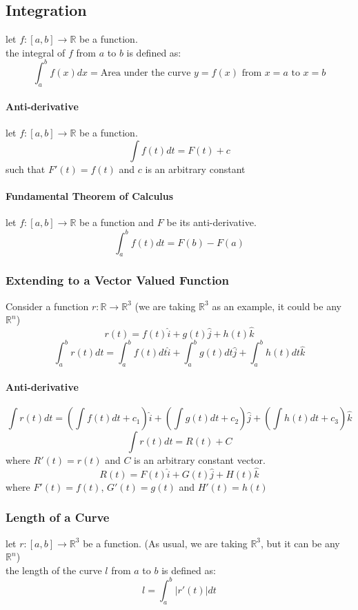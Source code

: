 \documentclass{article}
\begin{document}
\subsection{Integration}
let $f: [a,b] \rightarrow \mathbb{R}$ be a function.\\

the integral of $f$ from $a$ to $b$ is defined as:
\[\int_a^b f(x) dx = \text{Area under the curve $y = f(x)$ from $x = a$ to $x = b$}\]

\paragraph{Anti-derivative}let $f: [a,b] \rightarrow \mathbb{R}$ be a function.\\
\[ \int f(t) dt = F(t) +c \]
such that $F'(t) = f(t)$ and $c$ is an arbitrary constant

\paragraph{Fundamental Theorem of Calculus} let $f: [a,b] \rightarrow \mathbb{R}$ be a function and $F$ be its anti-derivative.\\
\[ \int_{a}^{b} f(t) dt = F(b) - F(a) \]

\subsubsection{Extending to a Vector Valued Function}
Consider a function $r: \mathbb{R} \rightarrow \mathbb{R}^3$ (we are taking $\mathbb{R}^3$ as an example, it could be any $\mathbb{R}^n$)\\
\[ r(t) = f(t)\hat{i} + g(t)\hat{j} + h(t)\hat{k} \]
\[\int_{a}^{b}r(t)dt = \int_{a}^{b}f(t)dt\hat{i} + \int_{a}^{b}g(t)dt\hat{j} + \int_{a}^{b}h(t)dt\hat{k} \]

\paragraph{Anti-derivative}
\[ \int r(t) dt = \left(\int f(t)dt + c_1\right)\hat{i} + \left(\int g(t)dt + c_2\right)\hat{j} + \left(\int h(t)dt + c_3\right)\hat{k}  \]
\[ \int r(t) dt = R(t) + C \]
where $R'(t) = r(t)$ and $C$ is an arbitrary constant vector.
\[ R(t) = F(t)\hat{i} + G(t)\hat{j} + H(t)\hat{k} \]
where $F'(t) = f(t)$, $G'(t) = g(t)$ and $H'(t) = h(t)$

\subsubsection{Length of a Curve}
let $r: [a,b] \rightarrow \mathbb{R}^3$ be a function. (As usual, we are taking $\mathbb{R}^3$, but it can be any $\mathbb{R}^n$)\\
the length of the curve $l$ from $a$ to $b$ is defined as:
\[ l = \int_{a}^{b} |r'(t)| dt \] 
\end{document}
